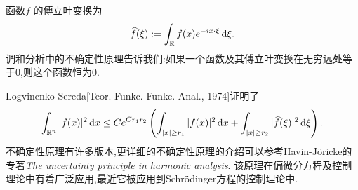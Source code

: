 \begin{frame}[t]
  函数$f$ 的傅立叶变换为
  \begin{equation}
    \widehat{f}(\xi):=\int_{\mathbb{R}} f(x)e^{-ix\cdot \xi}\,\mathrm{d}\xi.
  \end{equation}
  调和分析中的不确定性原理告诉我们:如果一个函数及其傅立叶变换在无穷远处等于$0$,则这个函数恒为$0$.


  Logvinenko-Sereda[Teor. Funkc. Funkc. Anal., 1974]证明了
 \begin{equation}\label{unc}
   \int_{\mathbb{R}^{n}}|f(x)|^2\,\mathrm{d}x\le C e^{Cr_1r_2}\left( \int_{|x|\ge r_1}|f(x)|^2\,\mathrm{d}x+\int_{|x|\ge r_2}|\widehat{f}(\xi)|^2\,\mathrm{d}\xi \right).
 \end{equation}
 不确定性原理有许多版本,更详细的不确定性原理的介绍可以参考Havin-J\"{o}ricke的专著\textit{The uncertainty principle in harmonic analysis}. 该原理在偏微分方程及控制理论中有着广泛应用,最近它被应用到Schr\"{o}dinger方程的控制理论中. 
\end{frame}

